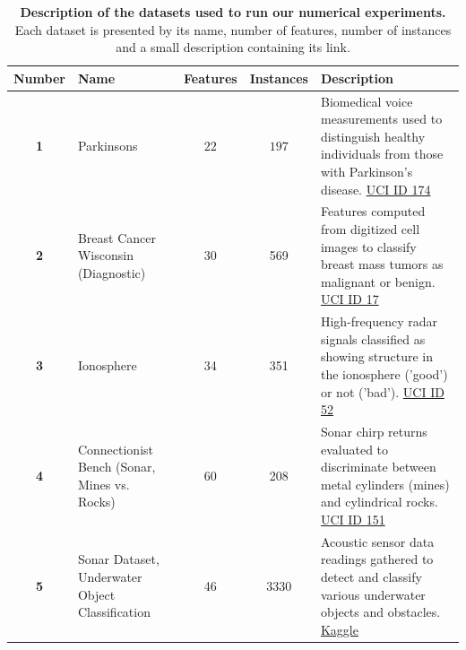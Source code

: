 \documentclass[12pt, openany]{article}
\begin{document}
\begin{table}[H]
    \centering
    \renewcommand{\arraystretch}{1.5}
    \begin{tabularx}{\textwidth}{|c|>{\centering\arraybackslash}p{4cm}|c|c|X|}
        \hline 
        \textbf{Number} & \textbf{Name} & \textbf{Features} & \textbf{Instances} & \textbf{Description} \\ \hline

        \textbf{1} & Parkinsons & $22$ & $197$ & Biomedical voice measurements used to distinguish healthy individuals from those with Parkinson's disease. \newline \href{https://archive.ics.uci.edu/dataset/174/parkinsons}{UCI ID 174}
        \\ \hdashline

        \textbf{2} & Breast Cancer Wisconsin (Diagnostic) & 30 & 569 & Features computed from digitized cell images to classify breast mass tumors as malignant or benign. \newline \href{https://archive.ics.uci.edu/dataset/17/breast+cancer+wisconsin+diagnostic}{UCI ID 17}
        \\ \hdashline

        \textbf{3} & Ionosphere & 34 & 351 & High-frequency radar signals classified as showing structure in the ionosphere ('good') or not ('bad'). \newline \href{https://archive.ics.uci.edu/dataset/52/ionosphere}{UCI ID 52}
        \\ \hdashline

        \textbf{4} & Connectionist Bench (Sonar, Mines vs. Rocks) & 60 & 208 & Sonar chirp returns evaluated to discriminate between metal cylinders (mines) and cylindrical rocks. \newline \href{https://archive.ics.uci.edu/dataset/151/connectionist+bench+sonar+mines+vs+rocks}{UCI ID 151}
        \\ \hdashline

        \textbf{5} & Sonar Dataset, Underwater Object Classification & 46 & 3330 & Acoustic sensor data readings gathered to detect and classify various underwater objects and obstacles. \newline \href{https://www.kaggle.com/datasets/meruvakodandasuraj/sonar-dataset-underwater-object-classification}{Kaggle}
        \\ 

        \hline
    \end{tabularx}
    \caption{\textbf{Description of the datasets used to run our numerical experiments.} Each dataset is presented by its name, number of features, number of instances and a small description containing its link.}
    \label{tab:datasets_description}
\end{table}
\end{document}
